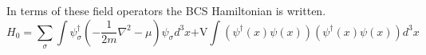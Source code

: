 \documentclass{article}
\begin{document}
In terms of these field operators the BCS Hamiltonian is written.
\begin{equation}
    \mathit{H_0}=
    \sum_{\substack{
        \sigma
    }}
    \int{
        \psi^\dagger_\sigma\left(-\frac{1}{2m}\nabla^2-\mu\right)\psi_\sigma{d^3}x
    }
    {\textrm{+V}}
    \int{
        (\psi^\dagger(x)\psi(x))(\psi^\dagger(x)\psi(x)){d^3}x
    }
\end{equation}
\end{document}
